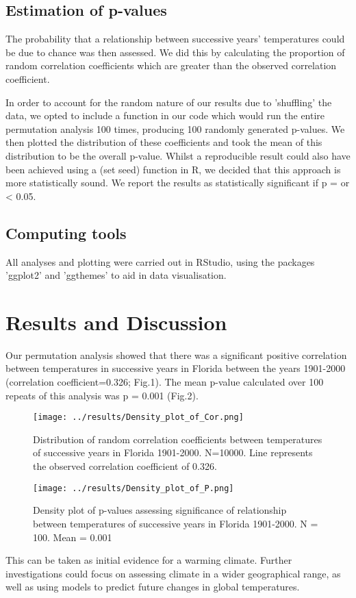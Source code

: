 \documentclass{article}
\begin{document}
	\subsection{Estimation of p-values}
	
	The probability that a relationship between successive years' temperatures could be due to chance was then assessed. We did this by calculating the proportion of random correlation coefficients which are greater than the observed correlation coefficient.
	
	In order to account for the random nature of our results due to 'shuffling' the data, we opted to include a function in our code which would run the entire permutation analysis 100 times, producing 100 randomly generated p-values. We then plotted the distribution of these coefficients and took the mean of this distribution to be the overall p-value. Whilst a reproducible result could also have been achieved using a (set seed) function in R, we decided that this approach is more statistically sound. We report the results as statistically significant if p = or < 0.05.
	
	
	\subsection{Computing tools}
	All analyses and plotting were carried out in RStudio, using the packages 'ggplot2' and 'ggthemes' to aid in data visualisation.
	
	\section{Results and Discussion}
	
	Our permutation analysis showed that there was a significant positive correlation between temperatures in successive years in Florida between the years 1901-2000 (correlation coefficient=0.326; Fig.1). The mean p-value calculated over 100 repeats of this analysis was p = 0.001 (Fig.2).
	
	\begin{figure}[H]
		\centering
		\texttt{[image: ../results/Density\_plot\_of\_Cor.png]}
		\caption{Distribution of random correlation coefficients between temperatures of successive years in Florida 1901-2000. N=10000. Line represents the observed correlation coefficient of 0.326.}
		\label{fig:my_label}
	\end{figure}
	
	\begin{figure}[H]
		\centering
		\texttt{[image: ../results/Density\_plot\_of\_P.png]}
		\caption{Density plot of p-values assessing significance of relationship between temperatures of successive years in Florida 1901-2000. N = 100. Mean = 0.001}
		\label{fig:my_label}
	\end{figure}
	
	This can be taken as initial evidence for a warming climate. Further investigations could focus on assessing climate in a wider geographical range, as well as using models to predict future changes in global temperatures.
	
\end{document}
